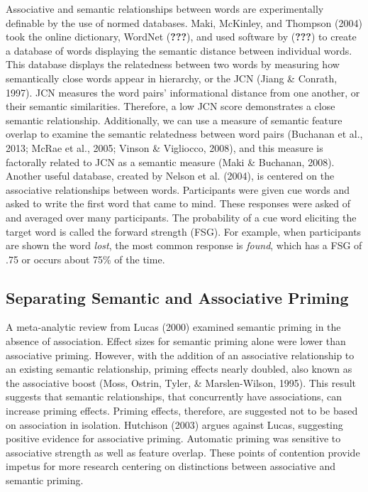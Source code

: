 \documentclass[english,man]{apa6}
\theoremstyle{definition}
\theoremstyle{definition}
\theoremstyle{definition}
\theoremstyle{remark}
\begin{document}
Associative and semantic relationships between words are experimentally
definable by the use of normed databases. Maki, McKinley, and Thompson
(2004) took the online dictionary, WordNet ({\textbf{???}}), and used
software by ({\textbf{???}}) to create a database of words displaying
the semantic distance between individual words. This database displays
the relatedness between two words by measuring how semantically close
words appear in hierarchy, or the JCN (Jiang \& Conrath, 1997). JCN
measures the word pairs' informational distance from one another, or
their semantic similarities. Therefore, a low JCN score demonstrates a
close semantic relationship. Additionally, we can use a measure of
semantic feature overlap to examine the semantic relatedness between
word pairs (Buchanan et al., 2013; McRae et al., 2005; Vinson \&
Vigliocco, 2008), and this measure is factorally related to JCN as a
semantic measure (Maki \& Buchanan, 2008). Another useful database,
created by Nelson et al. (2004), is centered on the associative
relationships between words. Participants were given cue words and asked
to write the first word that came to mind. These responses were asked of
and averaged over many participants. The probability of a cue word
eliciting the target word is called the forward strength (FSG). For
example, when participants are shown the word \emph{lost}, the most
common response is \emph{found}, which has a FSG of .75 or occurs about
75\% of the time.

\subsection{Separating Semantic and Associative
Priming}\label{separating-semantic-and-associative-priming}

A meta-analytic review from Lucas (2000) examined semantic priming in
the absence of association. Effect sizes for semantic priming alone were
lower than associative priming. However, with the addition of an
associative relationship to an existing semantic relationship, priming
effects nearly doubled, also known as the associative boost (Moss,
Ostrin, Tyler, \& Marslen-Wilson, 1995). This result suggests that
semantic relationships, that concurrently have associations, can
increase priming effects. Priming effects, therefore, are suggested not
to be based on association in isolation. Hutchison (2003) argues against
Lucas, suggesting positive evidence for associative priming. Automatic
priming was sensitive to associative strength as well as feature
overlap. These points of contention provide impetus for more research
centering on distinctions between associative and semantic priming.
\end{document}

